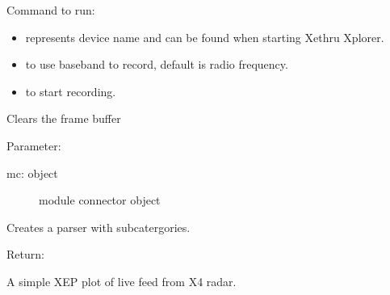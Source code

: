 \documentclass[letterpaper,10pt,english]{sphinxmanual}
\begin{document}
Command to run: 
\begin{itemize}
\item {} 
 represents device name and can be found when starting Xethru Xplorer.

\item {} 
 to use baseband to record, default is radio frequency.

\item {} 
 to start recording.

\end{itemize}
\label{\detokenize{X4 radar:module-X4_record_playback}}

\begin{fulllineitems}
\label{\detokenize{X4 radar:X4_record_playback.clear_buffer}}
Clears the frame buffer

Parameter:
\begin{description}
\item[{mc: object}] \leavevmode
module connector object

\end{description}

\end{fulllineitems}


\begin{fulllineitems}
\label{\detokenize{X4 radar:X4_record_playback.main}}
Creates a parser with subcatergories.

Return:

A simple XEP plot of live feed from X4 radar.

\end{fulllineitems}

\end{document}

